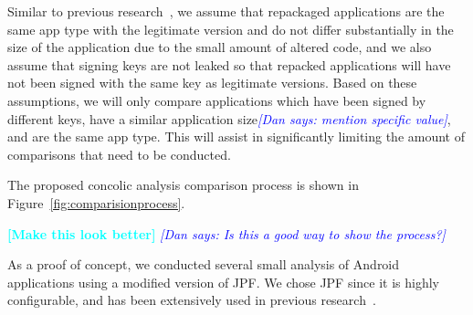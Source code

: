 \documentclass{sig-alternate}
\newcommand{\todo}[1]{\textcolor{cyan}{\textbf{[#1]}}}
\newcommand{\dan}[1]{\textcolor{blue}{{\it [Dan says: #1]}}}
\begin{document}
Similar to previous research~\cite{Zhou:2012:DRS:2133601.2133640}, we assume that repackaged applications are the same app type with the legitimate version and do not differ substantially in the size of the application due to the small amount of altered code, and we also assume that signing keys are not leaked so that repacked applications will have not been signed with the same key as legitimate versions. Based on these assumptions, we will only compare applications which have been signed by different keys, have a similar application size\dan{mention specific value}, and are the same app type. This will assist in significantly limiting the amount of comparisons that need to be conducted.




The proposed concolic analysis comparison process is shown in Figure~\ref{fig:comparisionprocess}.






\todo{Make this look better}
\dan{Is this a good way to show the process?}


As a proof of concept, we conducted several small analysis of Android applications using a modified version of JPF. We chose JPF since it is highly configurable, and has been extensively used in previous research~\cite{Visser:2004:TIG:1013886.1007526,Kalibera:2010:ETS:1850771.1850794}.
























\end{document}
